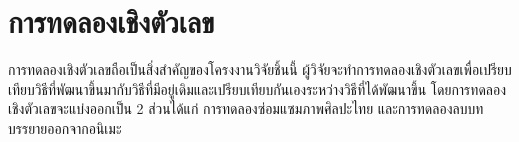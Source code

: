 \chapter{การทดลองเชิงตัวเลข}

\hspace{1cm} การทดลองเชิงตัวเลขถือเป็นสิ่งสำคัญของโครงงานวิจัยชิ้นนี้ ผู้วิจัยจะทำการทดลองเชิงตัวเลขเพื่อเปรียบเทียบวิธีที่พัฒนาขึ้นมากับวิธีที่มีอยู่เดิมและเปรียบเทียบกันเองระหว่างวิธีที่ได้พัฒนาขึ้น โดยการทดลองเชิงตัวเลขจะแบ่งออกเป็น 2 ส่วนได้แก่ การทดลองซ่อมแซมภาพศิลปะไทย และการทดลองลบบทบรรยายออกจากอนิเมะ 



\clearpage
